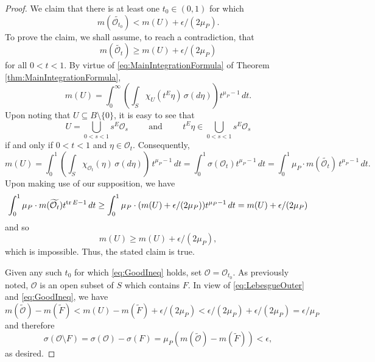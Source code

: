 \documentclass[11pt]{article}
\begin{document}
\begin{proof}
We claim that there is at least one $t_0\in (0,1)$ for which 
\begin{equation}\label{eq:GoodIneq}
m(\widetilde{\mathcal{O}_{t_0}})< m(U)+\epsilon/(2\mu_P).
\end{equation}
To prove the claim, we shall assume, to reach a contradiction, that 
\begin{equation*}
m(\widetilde{\mathcal{O}_{t}})\geq m(U)+\epsilon/(2\mu_P)
\end{equation*}
for all $0<t<1$. By virtue of \eqref{eq:MainIntegrationFormula} of Theorem \ref{thm:MainIntegrationFormula},
\begin{equation*}
m(U)=\int_{0}^\infty\left(\int_S \chi_{U}(t^E\eta)\,\sigma(d\eta)\right)t^{\mu_P-1}\,dt.
\end{equation*}
Upon noting that $U\subseteq B\setminus\{0\}$, it is easy to see that
\begin{equation*}
U=\bigcup_{0<s<1}s^E\mathcal{O}_s
\hspace{1cm}\mbox{and}\hspace{1cm}
t^E\eta\in \bigcup_{0<s<1}s^E\mathcal{O}_s
\end{equation*}
if and only if $0<t<1$ and $\eta\in \mathcal{O}_t$. Consequently,
\begin{equation*}
m(U)=\int_0^1\left(\int_S\chi_{\mathcal{O}_t}(\eta)\,\sigma(d\eta)\right)\,t^{\mu_P-1}\,dt=\int_0^1\sigma(\mathcal{O}_t)t^{\mu_P-1}\,dt=\int_0^1 \mu_P\cdot m(\widetilde{\mathcal{O}_t})\,t^{\mu_P-1}\,dt.
\end{equation*}
Upon making use of our supposition, we have
\begin{equation*}
\int_0^1\mu_P\cdot m(\widetilde{\mathcal{O}_t})t^{\tr E-1}\,dt\geq \int_0^1\mu_P\cdot (m(U)+\epsilon/(2\mu_P))t^{\mu_P-1}\,dt=m(U)+\epsilon/(2\mu_P)
\end{equation*}
and so
\begin{equation*}
m(U)\geq m(U)+\epsilon/(2\mu_P),
\end{equation*}
which is impossible. Thus, the stated claim is true.

Given any such $t_0$ for which \eqref{eq:GoodIneq} holds, set $\mathcal{O}=\mathcal{O}_{t_0}$. As previously noted, $\mathcal{O}$ is an open subset of $S$ which contains $F$. In view of \eqref{eq:LebesgueOuter} and \eqref{eq:GoodIneq}, we have
\begin{equation*}
m(\widetilde{\mathcal{O}})-m(\widetilde{F})<m(U)-m(\widetilde{F})+\epsilon/(2\mu_P)<\epsilon/(2\mu_P)+\epsilon/(2\mu_P)=\epsilon/\mu_P
\end{equation*}
and therefore
\begin{equation*}
\sigma(\mathcal{O}\setminus F)=\sigma(\mathcal{O})-\sigma(F)=\mu_P(m(\widetilde{\mathcal{O}})-m(\widetilde{F}))<\epsilon,
\end{equation*}
as desired.
\end{proof}
\end{document}

